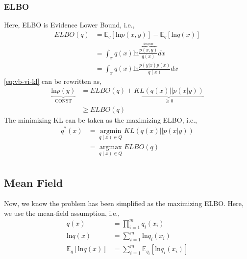\documentclass{article}
\begin{document}
\subsubsection{ELBO}
Here, ELBO is Evidence Lower Bound, i.e.,
\begin{align}
ELBO(q) &= \mathbb{E}_q[\text{ln}p(x,y)] - \mathbb{E}_q [\text{ln} q(x)] \label{eq:vb-vi-elbo}\\ 
&= \int_x q(x)\text{ln}\frac{\overbrace{p(x,y)}^{known}}{q(x)}dx \\
&= \int_x q(x)\text{ln}\frac{p(y|x)p(x)}{q(x)}dx
\end{align}
\eqref{eq:vb-vi-kl} can be rewritten as,
\begin{equation}
\begin{split}
\underbrace{\text{ln}p(y)}_{\text{CONST}} &= ELBO(q) + \underbrace{KL(q(x) || p(x|y))}_{\geq 0} \\
&\geq ELBO(q)
\end{split}
\end{equation}
The minimizing KL can be taken as the maximizing ELBO, i.e.,
\begin{equation}
\begin{split}
q^*(x) &= \mathop{\arg\min}\limits_{q(x)\in Q} KL(q(x) || p(x|y)) \\
&= \mathop{\arg\max}\limits_{q(x)\in Q} ELBO(q) \\
\end{split}
\end{equation}
\subsection{Mean Field}
Now, we know the problem has been simplified as the maximizing ELBO. Here, we use the mean-field assumption, i.e.,
\begin{equation}
\begin{split}
q(x) &= \prod_{i=1}^m q_i(x_i) \\
\text{ln}q(x) &= \sum_{i=1}^m \text{ln}q_i(x_i) \\
\mathbb{E}_q [\text{ln} q(x)] &=   \sum_{i=1}^m\mathbb{E}_{q_i} [\text{ln} q_i(x_i)] 
\end{split}
\label{eq:vb-mf}
\end{equation}
\end{document}
